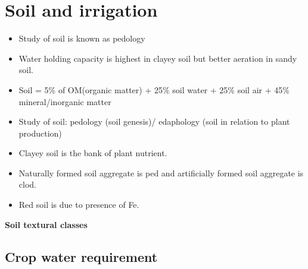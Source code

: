 \documentclass[
  openany]{book}
\providecommand{\tightlist}{%
  \setlength{\itemsep}{0pt}\setlength{\parskip}{0pt}}
\begin{document}
\hypertarget{soil-and-irrigation}{%
\chapter{Soil and irrigation}\label{soil-and-irrigation}}

\begin{itemize}
\tightlist
\item
  Study of soil is known as pedology
\item
  Water holding capacity is highest in clayey soil but better aeration in sandy soil.
\item
  Soil = 5\% of OM(organic matter) + 25\% soil water + 25\% soil air + 45\% mineral/inorganic matter
\item
  Study of soil: pedology (soil genesis)/ edaphology (soil in relation to plant production)
\item
  Clayey soil is the bank of plant nutrient.
\item
  Naturally formed soil aggregate is ped and artificially formed soil aggregate is clod.
\item
  Red soil is due to presence of Fe.
\end{itemize}

\textbf{Soil textural classes}

\hypertarget{crop-water-requirement}{%
\section{Crop water requirement}\label{crop-water-requirement}}
\end{document}
